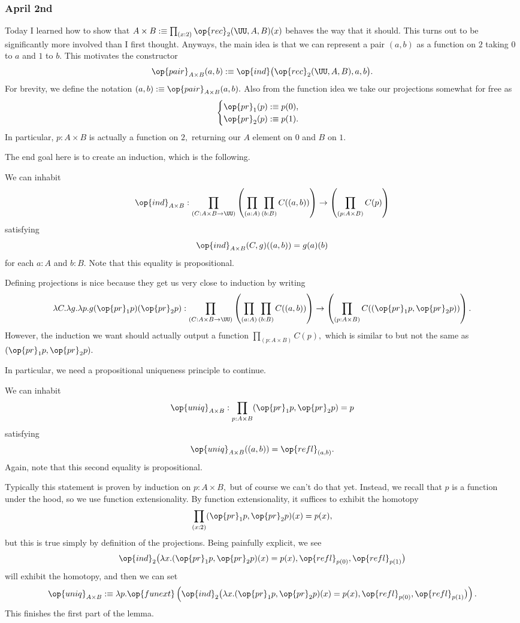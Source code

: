 \subsubsection{April 2nd}
Today I learned how to show that $A\times B:\equiv\prod_{(x:2)}\op{rec}_2(\UU,A,B)(x)$ behaves the way that it should. This turns out to be significantly more involved than I first thought. Anyways, the main idea is that we can represent a pair $(a,b)$ as a function on $2$ taking $0$ to $a$ and $1$ to $b.$ This motivates the constructor
\[\op{pair}_{A\times B}(a,b):\equiv\op{ind}\big(\op{rec}_2(\UU,A,B),a,b\big).\]
For brevity, we define the notation $(a,b):\equiv\op{pair}_{A\times B}(a,b).$ Also from the function idea we take our projections somewhat for free as
\[\begin{cases}
    \op{pr}_1(p):\equiv p(0), \\
    \op{pr}_2(p):\equiv p(1).
\end{cases}\]
In particular, $p:A\times B$ is actually a function on $2,$ returning our $A$ element on $0$ and $B$ on $1.$

The end goal here is to create an induction, which is the following.
\begin{proposition}
    We can inhabit
    \[\op{ind}_{A\times B}:\prod_{(C:A\times B\to\UU)}\left(\prod_{(a:A)}\prod_{(b:B)}C((a,b))\right)\to\left(\prod_{(p:A\times B)}C(p)\right)\]
    satisfying
    \[\op{ind}_{A\times B}(C,g)((a,b))=g(a)(b)\]
    for each $a:A$ and $b:B.$ Note that this equality is propositional.
\end{proposition}
Defining projections is nice because they get us very close to induction by writing
\[\lambda C.\lambda g.\lambda p.g(\op{pr}_1p)(\op{pr}_2p):\prod_{(C:A\times B\to\UU)}\left(\prod_{(a:A)}\prod_{(b:B)}C((a,b))\right)\to\left(\prod_{(p:A\times B)}C((\op{pr}_1p,\op{pr}_2p))\right).\]
However, the induction we want should actually output a function $\prod_{(p:A\times B)}C(p),$ which is similar to but not the same as $(\op{pr}_1p,\op{pr}_2p).$

In particular, we need a propositional uniqueness principle to continue.
\begin{lemma}
    We can inhabit
    \[\op{uniq}_{A\times B}:\prod_{p:A\times B}(\op{pr}_1p,\op{pr}_2p)=p\]
    satisfying
    \[\op{uniq}_{A\times B}((a,b))=\op{refl}_{(a,b)}.\]
    Again, note that this second equality is propositional.
\end{lemma}
Typically this statement is proven by induction on $p:A\times B,$ but of course we can't do that yet. Instead, we recall that $p$ is a function under the hood, so we use function extensionality. By function extensionality, it suffices to exhibit the homotopy
\[\prod_{(x:2)}(\op{pr}_1p,\op{pr}_2p)(x)=p(x),\]
but this is true simply by definition of the projections. Being painfully explicit, we see
\[\op{ind}_2\big(\lambda x.(\op{pr}_1p,\op{pr}_2p)(x)=p(x),\op{refl}_{p(0)},\op{refl}_{p(1)}\big)\]
will exhibit the homotopy, and then we can set
\[\op{uniq}_{A\times B}:\equiv\lambda p.\op{funext}\left(\op{ind}_2\big(\lambda x.(\op{pr}_1p,\op{pr}_2p)(x)=p(x),\op{refl}_{p(0)},\op{refl}_{p(1)}\big)\right).\]
This finishes the first part of the lemma.

